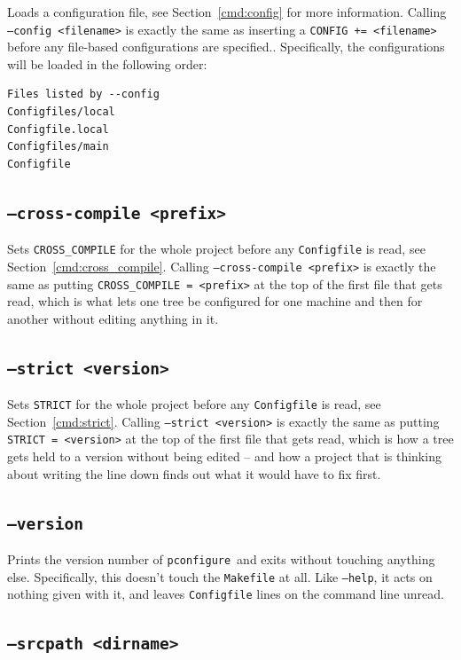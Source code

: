 \documentclass{article}
\newcommand{\pconfigure}{\texttt{pconfigure}}
\begin{document}
Loads a configuration file, see Section~\ref{cmd:config} for more information.
Calling \texttt{--config <filename>} is exactly the same as inserting a
\texttt{CONFIG += <filename>} before any file-based configurations are
specified..  Specifically, the configurations will be loaded in the following
order:

\begin{verbatim}
Files listed by --config
Configfiles/local
Configfile.local
Configfiles/main
Configfile
\end{verbatim}

\subsection{\texttt{--cross-compile <prefix>} \label{cl:cross_compile}}

Sets \texttt{CROSS\_COMPILE} for the whole project before any
\texttt{Configfile} is read, see Section~\ref{cmd:cross_compile}.
Calling \texttt{--cross-compile <prefix>} is exactly the same as
putting \texttt{CROSS\_COMPILE = <prefix>} at the top of the first
file that gets read, which is what lets one tree be configured for
one machine and then for another without editing anything in it.

\subsection{\texttt{--strict <version>} \label{cl:strict}}

Sets \texttt{STRICT} for the whole project before any
\texttt{Configfile} is read, see Section~\ref{cmd:strict}.  Calling
\texttt{--strict <version>} is exactly the same as putting
\texttt{STRICT = <version>} at the top of the first file that gets
read, which is how a tree gets held to a version without being edited
-- and how a project that is thinking about writing the line down
finds out what it would have to fix first.

\subsection{\texttt{--version}}

Prints the version number of \pconfigure\ and exits without touching
anything else.  Specifically, this doesn't touch the \texttt{Makefile}
at all.  Like \texttt{--help}, it acts on nothing given with it, and
leaves \texttt{Configfile} lines on the command line unread.

\subsection{\texttt{--srcpath <dirname>} \label{cl:srcpath}}
\end{document}
